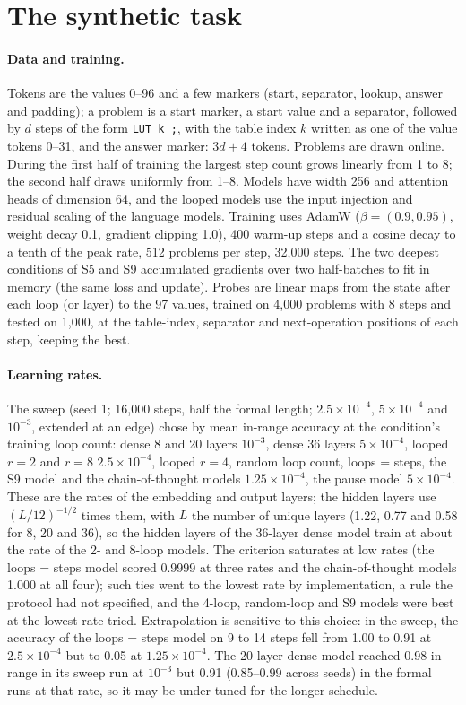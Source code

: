 \section{The synthetic task}
\label{app:synthetic}

\paragraph{Data and training.} Tokens are the values 0--96 and a few markers (start, separator, lookup, answer and
padding); a problem is a start marker, a start value and a separator, followed by $d$ steps of the form \texttt{LUT k ;}, with
the table index $k$ written as one of the value tokens 0--31, and the answer marker: $3d + 4$ tokens. Problems are drawn online. During
the first half of training the largest step count grows linearly from 1 to 8; the second half draws uniformly from
1--8. Models have width 256 and attention heads of dimension 64, and the looped models use the input injection and
residual scaling of the language models. Training uses AdamW ($\beta = (0.9, 0.95)$, weight decay 0.1, gradient clipping
1.0), 400 warm-up steps and a cosine decay to a tenth of the peak rate, 512 problems per step, 32{,}000 steps. The two
deepest conditions of S5 and S9 accumulated gradients over two half-batches to fit in memory (the same loss and update).
Probes are linear maps from the state after each loop (or layer) to the 97 values, trained on 4{,}000 problems with 8 steps and tested on 1{,}000, at the table-index, separator and next-operation positions of each step, keeping the best.

\paragraph{Learning rates.} The sweep (seed 1; 16{,}000 steps, half the formal length; $2.5\times10^{-4}$, $5\times10^{-4}$ and
$10^{-3}$, extended at an edge) chose by mean in-range accuracy at the condition's training loop count: dense 8 and 20 layers $10^{-3}$, dense 36 layers
$5\times10^{-4}$, looped $r = 2$ and $r = 8$ $2.5\times10^{-4}$, looped $r = 4$, random loop count, loops = steps, the S9
model and the chain-of-thought models $1.25\times10^{-4}$, the pause model $5\times10^{-4}$. These are the rates of the
embedding and output layers; the hidden layers use $(L/12)^{-1/2}$ times them, with $L$ the number of unique layers (1.22, 0.77 and 0.58 for 8, 20 and 36), so the hidden layers of the 36-layer
dense model train at about the rate of the 2- and 8-loop models. The criterion saturates at low rates (the loops = steps model scored 0.9999 at three rates and the chain-of-thought models
1.000 at all four); such ties went to the lowest rate by implementation, a rule the protocol had not specified, and the
4-loop, random-loop and S9 models were best at the lowest rate tried. Extrapolation is sensitive to this choice: in the
sweep, the accuracy of the loops = steps model on 9 to 14 steps fell from 1.00 to 0.91 at $2.5\times10^{-4}$ but to 0.05
at $1.25\times10^{-4}$. The 20-layer dense model reached 0.98 in range in its sweep run at $10^{-3}$ but 0.91 (0.85--0.99
across seeds) in the formal runs at that rate, so it may be under-tuned for the longer schedule.

